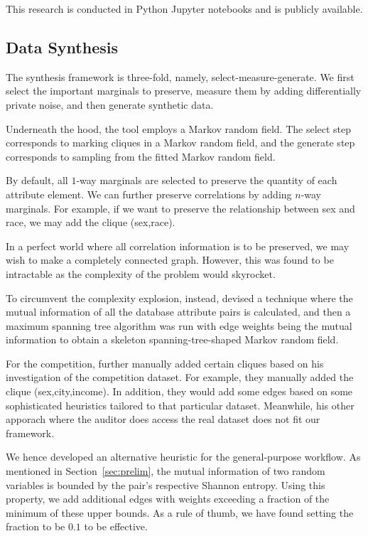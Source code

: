 \documentclass[manuscript,screen,review,anonymous]{acmart}
\begin{document}
This research is conducted in Python Jupyter notebooks and is publicly available.

\subsection{Data Synthesis}

The synthesis framework is three-fold, namely, select-measure-generate\cite{McKenna2022}. We first select the important marginals to preserve, measure them by adding differentially private noise, and then generate synthetic data.

Underneath the hood, the tool employs a Markov random field. The select step corresponds to marking cliques in a Markov random field, and the generate step corresponds to sampling from the fitted Markov random field.

By default, all $1$-way marginals are selected to preserve the quantity of each attribute element. We can further preserve correlations by adding $n$-way marginals. For example, if we want to preserve the relationship between sex and race, we may add the clique (sex,race).

In a perfect world where all correlation information is to be preserved, we may wish to make a completely connected graph. However, this was found to be intractable as the complexity of the problem would skyrocket.

To circumvent the complexity explosion, instead, \cite{McKenna_privatePGM,mckenna2021winning} devised a technique where the mutual information of all the database attribute pairs is calculated, and then a maximum spanning tree algorithm was run with edge weights being the mutual information to obtain a skeleton spanning-tree-shaped Markov random field.

For the competition, \cite{McKenna_privatePGM,mckenna2021winning} further manually added certain cliques based on his investigation of the competition dataset. For example, they manually added the clique (sex,city,income). In addition, they would add some edges based on some sophisticated heuristics tailored to that particular dataset. Meanwhile, his other apporach where the auditor does access the real dataset does not fit our framework.

We hence developed an alternative heuristic for the general-purpose workflow. As mentioned in Section~\ref{sec:prelim}, the mutual information of two random variables is bounded by the pair's respective Shannon entropy. Using this property, we add additional edges with weights exceeding a fraction of the minimum of these upper bounds. As a rule of thumb, we have found setting the fraction to be $0.1$ to be effective.
\end{document}
